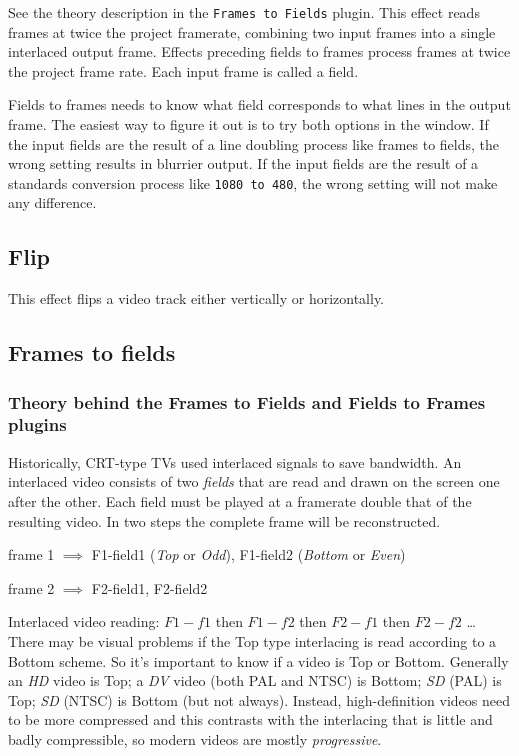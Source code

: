 See the theory description in the \texttt{Frames to Fields} plugin. This effect reads frames at twice the project framerate, combining two input frames into a single interlaced output frame. Effects preceding fields to frames process frames at twice the project frame rate. Each input frame is called a field.

Fields to frames needs to know what field corresponds to what lines in the output frame. The easiest way to figure it out is to try both options in the window. If the input fields are the result of a line doubling process like frames to fields, the wrong setting results in blurrier output. If the input fields are the result of a standards conversion process like \texttt{1080 to 480}, the wrong setting will not make any difference.

\subsection{Flip}%
\label{sub:flip}

This effect flips a video track either vertically or horizontally.

\subsection{Frames to fields}%
\label{sub:frames_to_fields}

\subsubsection*{Theory behind the Frames to Fields and Fields to Frames plugins}
\label{ssub:theory_frames_fields}

Historically, CRT-type TVs used interlaced signals to save bandwidth. An interlaced video consists of two \textit{fields} that are read and drawn on the screen one after the other. Each field must be played at a framerate double that of the resulting video. In two steps the complete frame will be reconstructed. 

frame 1 $\implies$ F1-field1 (\textit{Top} or \textit{Odd}), F1-field2 (\textit{Bottom} or \textit{Even})

frame 2 $\implies$ F2-field1, F2-field2

Interlaced video reading: $F1-f1$ then $F1-f2$ then $F2-f1$ then $F2-f2$ \dots
There may be visual problems if the Top type interlacing is read according to a Bottom scheme. So it's important to know if a video is Top or Bottom. Generally an \textit{HD} video is Top; a \textit{DV} video (both PAL and NTSC) is Bottom; \textit{SD} (PAL) is Top; \textit{SD} (NTSC) is Bottom (but not always). Instead, high-definition videos need to be more compressed and this contrasts with the interlacing that is little and badly compressible, so modern videos are mostly \textit{progressive}.

